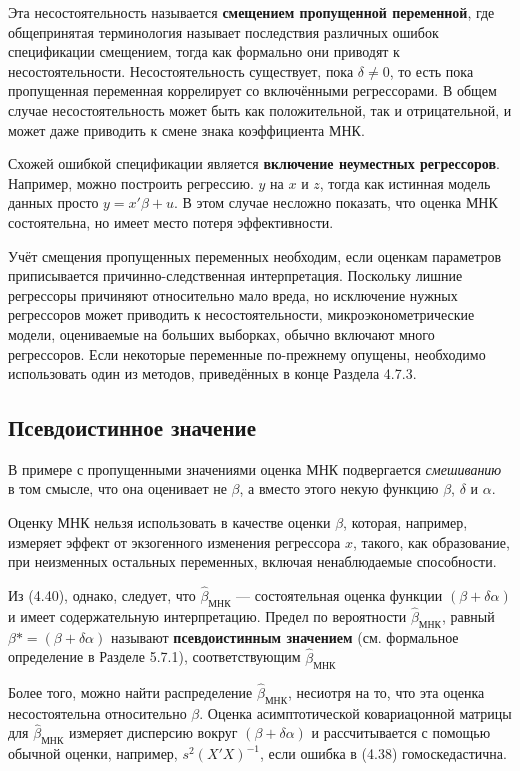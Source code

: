 Эта несостоятельность называется \textbf{смещением пропущенной переменной}, где общепринятая терминология называет последствия различных ошибок спецификации смещением, тогда как формально они приводят к несостоятельности. Несостоятельность существует, пока $\delta \neq 0$, то есть пока пропущенная переменная коррелирует со включёнными регрессорами. В общем случае несостоятельность может быть как положительной, так и отрицательной, и может даже приводить к смене знака коэффициента МНК.

Схожей ошибкой спецификации является \textbf{включение неуместных регрессоров}. Например, можно построить регрессию. $y$  на $x$ и $z$, тогда как истинная модель данных просто $y = x'\beta +u$. В этом случае несложно показать, что оценка МНК состоятельна, но имеет место потеря эффективности. 

Учёт смещения пропущенных переменных необходим, если оценкам параметров приписывается причинно-следственная интерпретация. Поскольку лишние регрессоры причиняют относительно мало вреда, но исключение нужных регрессоров может приводить к несостоятельности, микроэконометрические модели, оцениваемые на больших выборках, обычно включают много регрессоров. Если некоторые переменные по-прежнему опущены, необходимо использовать один из методов, приведённых в конце Раздела 4.7.3.

\subsection{Псевдоистинное значение}
В примере с пропущенными значениями оценка МНК подвергается \textit{смешиванию} в том смысле, что она оценивает не $\beta$, а вместо этого некую функцию $\beta$, $\delta$ и $\alpha$. 

Оценку МНК нельзя использовать в качестве оценки $\beta$, которая, например, измеряет эффект от экзогенного изменения регрессора $x$, такого, как образование, при неизменных остальных переменных, включая ненаблюдаемые способности.

Из (4.40), однако, следует, что $\hat{\beta}_{\text{МНК}}$ --- состоятельная оценка функции $(\beta +\delta \alpha)$ и имеет содержательную интерпретацию. Предел по вероятности $\hat{\beta}_{\text{МНК}}$, равный $\beta{*} = (\beta +\delta \alpha)$ называют \textbf{псевдоистинным значением} (см. формальное определение в Разделе 5.7.1), соответствующим $\hat{\beta}_{\text{МНК}}$

Более того, можно найти распределение $\hat{\beta}_{\text{МНК}}$, несиотря на то, что эта оценка несостоятельна относительно $\beta$. Оценка асимптотической ковариацонной матрицы для $\hat{\beta}_{\text{МНК}}$ измеряет дисперсию вокруг $(\beta +\delta \alpha)$ и рассчитывается с помощью обычной оценки, например, $s^2 (X'X)^{-1}$, если ошибка в (4.38) гомоскедастична.

